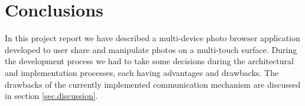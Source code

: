 \section{Conclusions}
\label{sec.conclusions}
In this project report we have described a multi-device photo browser
application developed to user share and manipulate photos on a multi-touch
surface. During the development process we had to take some decisions during the
architectural and implementation processes, each having advantages and
drawbacks. The drawbacks of the currently implemented communication mechanism
are discussed in section \ref{sec.discussion}.